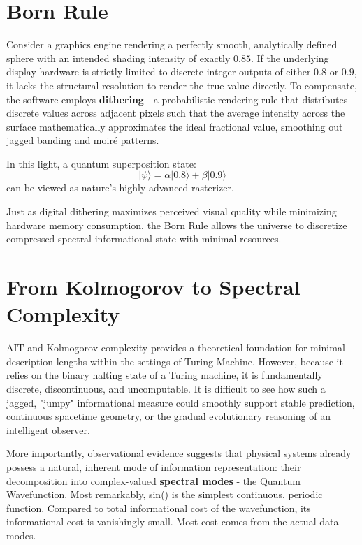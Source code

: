 \section{Born Rule}

Consider a graphics engine rendering a perfectly smooth, analytically defined sphere with an intended shading intensity of exactly $0.85$.
If the underlying display hardware is strictly limited to discrete integer outputs of either $0.8$ or $0.9$, it lacks the structural resolution to render the true value directly.
To compensate, the software employs \textbf{dithering}—a probabilistic rendering rule that distributes discrete values across adjacent pixels such that the average intensity 
across the surface mathematically approximates the ideal fractional value, smoothing out jagged banding and moiré patterns.

In this light, a quantum superposition state:
\[
|\psi\rangle = \alpha |0.8\rangle + \beta |0.9\rangle
\]
can be viewed as nature’s highly advanced rasterizer. 

Just as digital dithering maximizes perceived visual quality while minimizing hardware memory consumption, the Born Rule allows the universe to discretize 
compressed spectral informational state with minimal resources.



\section{From Kolmogorov to Spectral Complexity}

AIT and Kolmogorov complexity provides a theoretical foundation for minimal description lengths within the settings of Turing Machine. 
However, because it relies on the binary halting state of a Turing machine, it is fundamentally discrete, discontinuous, and uncomputable.
It is difficult to see how such a jagged, "jumpy" informational measure could smoothly support stable prediction, continuous spacetime geometry, 
or the gradual evolutionary reasoning of an intelligent observer.

More importantly, observational evidence suggests that physical systems already possess a natural, inherent mode of information representation: 
their decomposition into complex-valued \textbf{spectral modes} - the Quantum Wavefunction. Most remarkably, sin() is the simplest continuous, periodic function. 
Compared to total informational cost of the wavefunction, its informational cost is vanishingly small. Most cost comes from the actual data - modes.

